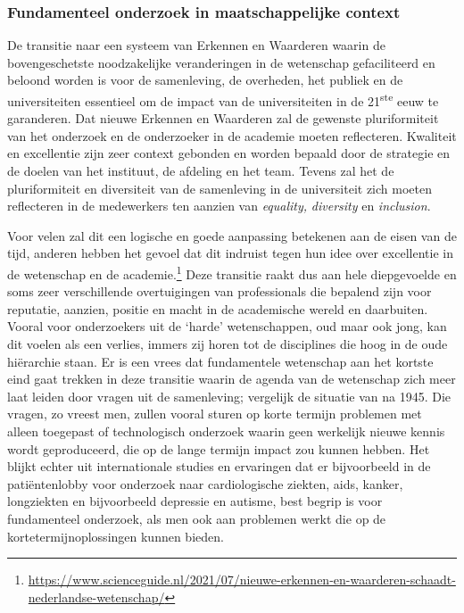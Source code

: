 \documentclass[smallauthor, chapterhaspagenum, nochapterinheader, pagenuminheader,  bigchapnum,medium2, tocpages, garamond, titleinheader]{jote-book}
\begin{document}
	\subsubsection{Fundamenteel onderzoek in maatschappelijke context}



	De transitie naar een systeem van Erkennen en Waarderen waarin de bovengeschetste noodzakelijke veranderingen in de wetenschap gefaciliteerd en beloond worden is voor de samenleving, de overheden, het publiek en de universiteiten essentieel om de impact van de universiteiten in de 21\textsuperscript{ste} eeuw te garanderen. Dat nieuwe Erkennen en Waarderen zal de gewenste pluriformiteit van het onderzoek en de onderzoeker in de academie moeten reflecteren. Kwaliteit en excellentie zijn zeer context gebonden en worden bepaald door de strategie en de doelen van het instituut, de afdeling en het team. Tevens zal het de pluriformiteit en diversiteit van de samenleving in de universiteit zich moeten reflecteren in de medewerkers ten aanzien van \emph{equality}\emph{, }\emph{diversity}\emph{ }en\emph{ }\emph{inclusion}.

	\enlargethispage{-\baselineskip}\checkandfixthelayout

	Voor velen zal dit een logische en goede aanpassing betekenen aan de eisen van de tijd, anderen hebben het gevoel dat dit indruist tegen hun idee over excellentie in de wetenschap en de academie.\footnote{\href{https://www.scienceguide.nl/2021/07/nieuwe-erkennen-en-waarderen-schaadt-nederlandse-wetenschap/}{https://www.scienceguide.nl/2021/07/nieuwe-erkennen-en-waarderen-schaadt-nederlandse-wetenschap/} } Deze transitie raakt dus aan hele diepgevoelde en soms zeer verschillende overtuigingen van professionals die bepalend zijn voor reputatie, aanzien, positie en macht in de academische wereld en daarbuiten. Vooral voor onderzoekers uit de ‘harde' wetenschappen, oud maar ook jong, kan dit voelen als een verlies, immers zij horen tot de disciplines die hoog in de oude hiërarchie staan. Er is een vrees dat fundamentele wetenschap aan het kortste eind gaat trekken in deze transitie waarin de agenda van de wetenschap zich meer laat leiden door vragen uit de samenleving; vergelijk de situatie van na 1945. Die vragen, zo vreest men, zullen vooral sturen op korte termijn problemen met alleen toegepast of technologisch onderzoek waarin geen werkelijk nieuwe kennis wordt geproduceerd, die op de lange termijn impact zou kunnen hebben. Het blijkt echter uit internationale studies en ervaringen dat er bijvoorbeeld in de patiëntenlobby voor onderzoek naar cardiologische ziekten, aids, kanker, longziekten en bijvoorbeeld depressie en autisme, best begrip is voor fundamenteel onderzoek, als men ook aan problemen werkt die op de kortetermijnoplossingen kunnen bieden.
\end{document}
